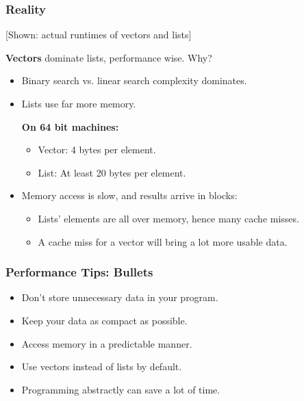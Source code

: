 \begin{frame}
  \frametitle{Reality}
  
  \begin{center}
    [Shown: actual runtimes of vectors and lists]
  \end{center}

  
  {\bf Vectors} dominate lists, performance wise. Why?
  \vfill
  \begin{itemize}
    \item Binary search vs. linear search complexity dominates.
    \vfill
    \item Lists use far more memory.

      {\bf On 64 bit machines:}
      \begin{itemize}
        \item Vector: 4 bytes per element.
        \item List: At least 20 bytes per element.
      \end{itemize}
    \vfill
    \item Memory access is slow, and results arrive in blocks:
      \begin{itemize}
        \item Lists' elements are all over memory, hence many
          cache misses.
        \item A cache miss for a vector will bring a lot more usable data.
      \end{itemize}
  \end{itemize}
  
\end{frame}

\begin{frame}
  \frametitle{Performance Tips: Bullets}

  
  \begin{itemize}
    \item Don't store unnecessary data in your program.
    \vfill
    \item Keep your data as compact as possible.
    \vfill
    \item Access memory in a predictable manner.
    \vfill
    \item Use vectors instead of lists by default.
    \vfill
    \item Programming abstractly can save a lot of time.
  \end{itemize}
  
\end{frame}


